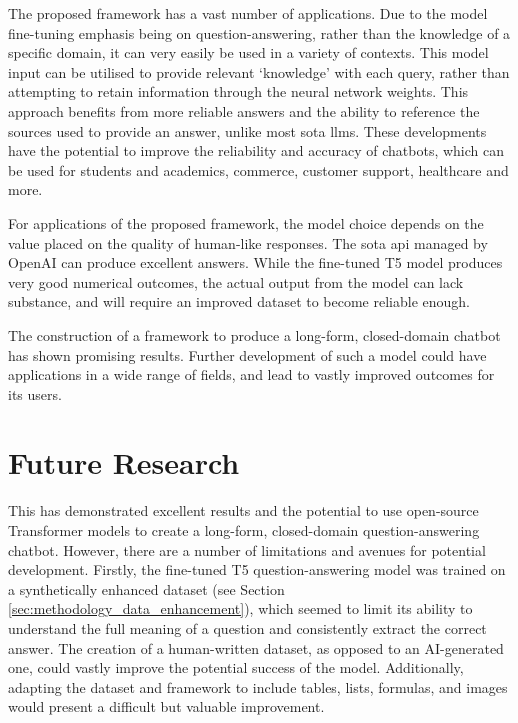 The proposed framework has a vast number of applications. Due to the model fine-tuning emphasis being on question-answering, rather than the knowledge of a specific domain, it can very easily be used in a variety of contexts. This model input can be utilised to provide relevant `knowledge' with each query, rather than attempting to retain information through the neural network weights. This approach benefits from more reliable answers and the ability to reference the sources used to provide an answer, unlike most \acrlong{sota} \acrshort{llm}s. These developments have the potential to improve the reliability and accuracy of chatbots, which can be used for students and academics, commerce, customer support, healthcare and more.

For applications of the proposed framework, the model choice depends on the value placed on the quality of human-like responses. The \acrlong{sota} \acrshort{api} managed by OpenAI can produce excellent answers. While the fine-tuned T5 model produces very good numerical outcomes, the actual output from the model can lack substance, and will require an improved dataset to become reliable enough.

The construction of a framework to produce a long-form, closed-domain chatbot has shown promising results. Further development of such a model could have applications in a wide range of fields, and lead to vastly improved outcomes for its users.





\section{Future Research}

This \papertype has demonstrated excellent results and the potential to use open-source Transformer models to create a long-form, closed-domain question-answering chatbot. However, there are a number of limitations and avenues for potential development. Firstly, the fine-tuned T5 question-answering model was trained on a synthetically enhanced dataset (see Section \ref{sec:methodology_data_enhancement}), which seemed to limit its ability to understand the full meaning of a question and consistently extract the correct answer. The creation of a human-written dataset, as opposed to an AI-generated one, could vastly improve the potential success of the model. Additionally, adapting the dataset and framework to include tables, lists, formulas, and images would present a difficult but valuable improvement.


